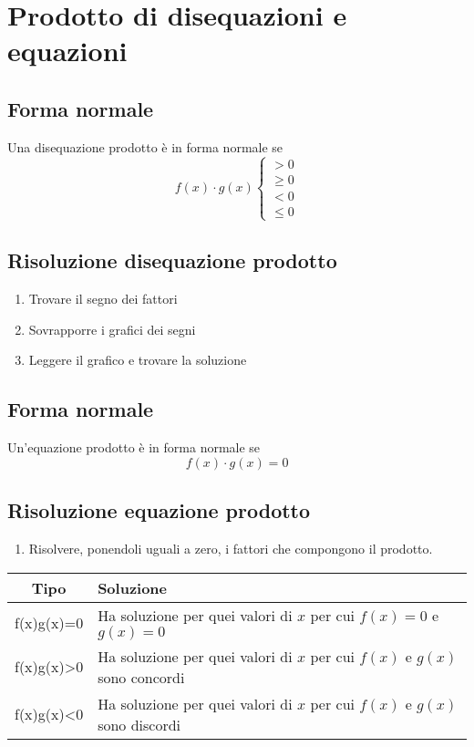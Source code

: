 \chapter{Prodotto di disequazioni e equazioni}
\section{Forma normale}
Una disequazione prodotto è in forma normale se
\begin{equation*}
f(x)\cdot g(x)\begin{cases}
>0\\
\geq 0\\
<0\\
\leq 0
\end{cases}
\end{equation*}
\section{Risoluzione disequazione prodotto}
\begin{enumerate}
	\item Trovare il segno dei fattori
	\item Sovrapporre i grafici dei segni
	\item Leggere il grafico e trovare la soluzione
\end{enumerate}
\section{Forma normale}
Un'equazione prodotto è in forma normale se
\begin{equation*}
f(x)\cdot g(x)=0
\end{equation*}
\section{Risoluzione equazione prodotto}
\begin{enumerate}
	\item Risolvere, ponendoli uguali a zero, i fattori che compongono il prodotto.
\end{enumerate}
{\centering{}
	\begin{tabular}{Cp{0.4\textwidth}}
		\toprule
		Tipo& Soluzione \\ 
		\midrule
		f(x)\cdot g(x)=0	& Ha soluzione per quei valori di $x$ per cui $f(x)=0$ e $g(x)= 0$  \\ 
		f(x)\cdot g(x)>0	& Ha soluzione per quei valori di $x$ per cui $f(x)$ e $g(x)$ sono concordi\\ 
	f(x)\cdot g(x)<0& Ha soluzione per quei valori di $x$ per cui $f(x)$ e $g(x)$ sono discordi\\ 
		\bottomrule
	\end{tabular}\par}